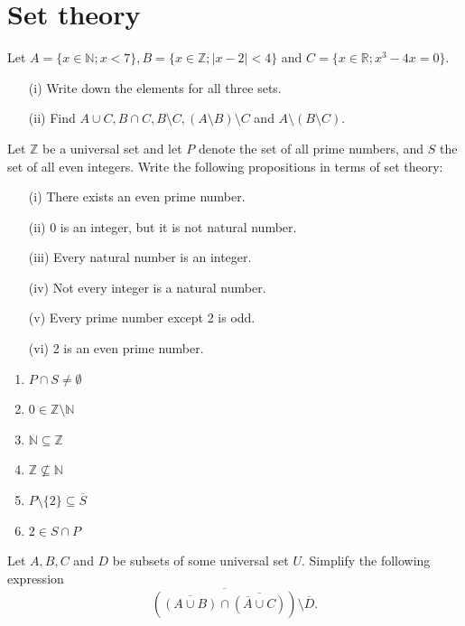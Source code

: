 \documentclass[11pt,paper=b5,footinclude,headinclude]{scrbook} %
\theoremstyle{remark}
\theoremstyle{definition} %
\theoremstyle{theorem} %
\newtheorem{ex}{Exercise\hypertarget{sol:\theex}}[chapter]
\begin{document}
    

\chapter{Set theory}

 \begin{ex}Let $A = \{ x \in \mathbb{N}; x < 7\}, B = \{x \in  \mathbb{Z}; |x - 2| < 4\}$ and $C = \{x \in\mathbb{R}; x^3 -  4x = 0\}$.
\begin{enumerate}
\item[(i)]  Write down the elements for all three sets.
\item[(ii)] Find $A \cup C, B \cap C, B \setminus C, (A \setminus B) \setminus C$ and $A \setminus (B \setminus C)$.
\end{enumerate}

\end{ex} \begin{ex}Let  $\mathbb{Z}$ be a universal set and let  $P$ denote the set of all prime numbers, and $S$ the set of all even integers. Write the following propositions in terms of set theory:
\begin{itemize}
\item[(i)] There exists an even prime number. 
\item[(ii)] $0$ is an integer, but it is not natural number. 
\item[(iii)] Every natural number is an integer. 
\item[(iv)] Not every integer is a natural number. 
\item[(v)] Every prime number except 2 is odd. 
\item[(vi)] 2 is an even prime number. 
\end{itemize}
\begin{sol}
    \begin{enumerate}[label=(\roman*)]
        \item $P\cap S \neq \emptyset$
        \item $0 \in \mathbb{Z}\setminus \mathbb{N}$
        \item $\mathbb{N}\subseteq \mathbb{Z}$
        \item $\mathbb{Z}\nsubseteq \mathbb{N}$
        \item $P\setminus \{2\} \subseteq \overline{S}$
        \item $2\in S\cap P$
    \end{enumerate}
\end{sol}
\end{ex} \begin{ex}Let  $A, B, C$ and $D$  be subsets of some universal set  $U$. Simplify the following expression
$$\overline{(\overline{(A\cup B)} \cap \overline{(\overline{A} \cup C)})}\setminus \overline{D}.$$


\end{ex}
\end{document}
